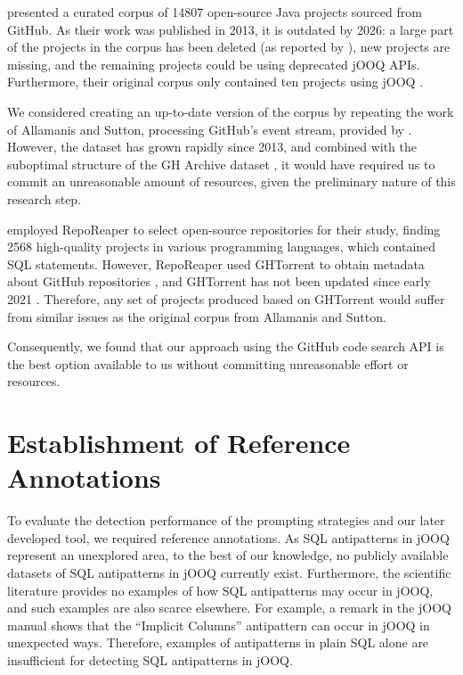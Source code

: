  presented a curated corpus of \num{14807} open-source Java projects sourced from GitHub. As their work was published in 2013, it is outdated by 2026: a large part of the projects in the corpus has been deleted (as reported by \citealp[p. 552]{goeminne2015towards}), new projects are missing, and the remaining projects could be using deprecated jOOQ APIs. Furthermore, their original corpus only contained ten projects using jOOQ .

We considered creating an up-to-date version of the corpus by repeating the work of Allamanis and Sutton, processing GitHub's event stream, provided by . However, the dataset has grown rapidly since 2013, and combined with the suboptimal structure of the GH Archive dataset , it would have required us to commit an unreasonable amount of resources, given the preliminary nature of this research step.

 employed RepoReaper  to select open-source repositories for their study, finding \num{2568} high-quality projects in various programming languages, which contained SQL statements. However, RepoReaper used GHTorrent  to obtain metadata about GitHub repositories , and GHTorrent has not been updated since early 2021 . Therefore, any set of projects produced based on GHTorrent would suffer from similar issues as the original corpus from Allamanis and Sutton.

Consequently, we found that our approach using the GitHub code search API is the best option available to us without committing unreasonable effort or resources.

\section{Establishment of Reference Annotations}\label{sec:groundTruth}

To evaluate the detection performance of the prompting strategies and our later developed tool, we required reference annotations. As SQL antipatterns in jOOQ represent an unexplored area, to the best of our knowledge, no publicly available datasets of SQL antipatterns in jOOQ currently exist. Furthermore, the scientific literature provides no examples of how SQL antipatterns may occur in jOOQ, and such examples are also scarce elsewhere. For example, a remark in the jOOQ manual  shows that the “Implicit Columns” antipattern  can occur in jOOQ in unexpected ways. Therefore, examples of antipatterns in plain SQL alone are insufficient for detecting SQL antipatterns in jOOQ.

